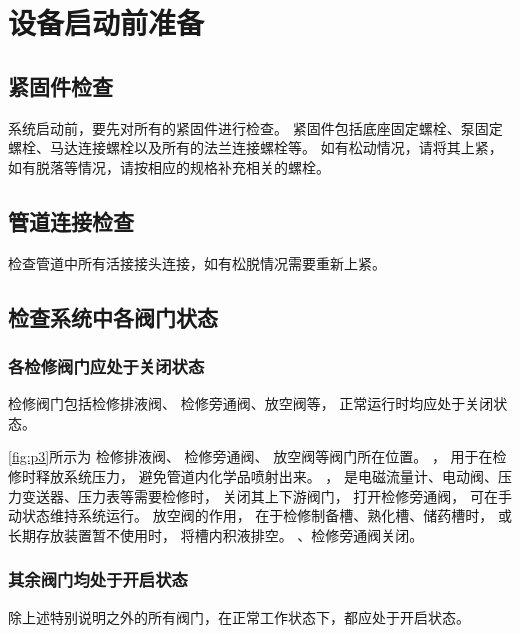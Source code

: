 \documentclass[UTF8,a4paper,12pt,titlepage]{ctexart}
\begin{document}
        


\newpage %

\section{设备启动前准备}\label{sec:sg1}
   \subsection{紧固件检查}
      系统启动前，要先对所有的紧固件进行检查。
      紧固件包括底座固定螺栓、泵固定螺栓、马达连接螺栓以及所有的法兰连接螺栓等。
      如有松动情况，请将其上紧，如有脱落等情况，请按相应的规格补充相关的螺栓。

   \subsection{管道连接检查}
      检查管道中所有活接接头连接，如有松脱情况需要重新上紧。

   \subsection{检查系统中各阀门状态}
      \subsubsection{各检修阀门应处于关闭状态}\label{sec:sg2}
         检修阀门包括检修排液阀、
         检修旁通阀、放空阀等，
         正常运行时均应处于关闭状态。

         

\newpage

      \ref{fig:p3}所示为
      检修排液阀、
      检修旁通阀、
      放空阀等阀门所在位置。
      ，
      用于在检修时释放系统压力，
      避免管道内化学品喷射出来。
      ，
      是电磁流量计、电动阀、压力变送器、压力表等需要检修时，
      关闭其上下游阀门，
      打开检修旁通阀，
      可在手动状态维持系统运行。
      放空阀的作用，
      在于检修制备槽、熟化槽、储药槽时，
      或长期存放装置暂不使用时，
      将槽内积液排空。
      、检修旁通阀关闭。

        \subsubsection{其余阀门均处于开启状态}
            除上述特别说明之外的所有阀门，在正常工作状态下，都应处于开启状态。
\end{document}
